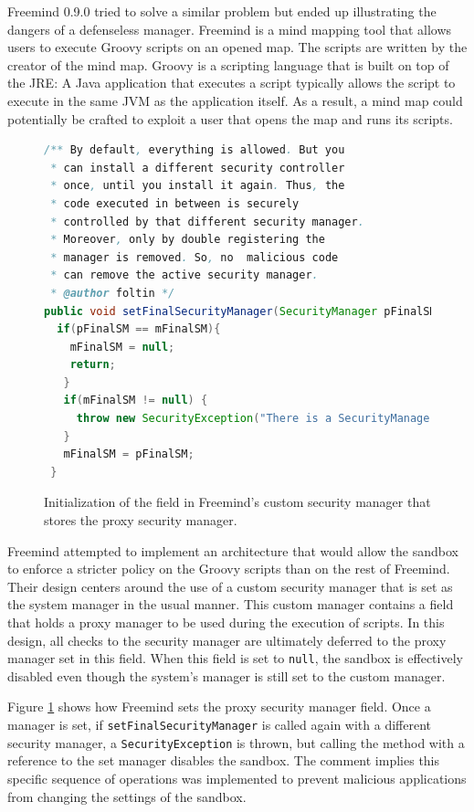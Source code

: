 \documentclass{sig-alternate}
\begin{document}
Freemind 0.9.0 tried to solve a similar problem but ended up illustrating
the dangers of a defenseless manager. Freemind is a mind mapping tool
that allows users to execute Groovy scripts on an opened map. The
scripts are written by the creator of the mind map. Groovy is a scripting
language that is built on top of the JRE: A Java application that
executes a script typically allows the script to execute in the same
JVM as the application itself. As a result, a mind map could potentially
be crafted to exploit a user that opens the map and runs its scripts.

\begin{figure}
\begin{lstlisting}[language=Java,firstnumber=31]
/** By default, everything is allowed. But you
 * can install a different security controller
 * once, until you install it again. Thus, the
 * code executed in between is securely
 * controlled by that different security manager.  
 * Moreover, only by double registering the
 * manager is removed. So, no  malicious code 
 * can remove the active security manager.  
 * @author foltin */
public void setFinalSecurityManager(SecurityManager pFinalSM) {
  if(pFinalSM == mFinalSM){
    mFinalSM = null;
    return;
   } 		
   if(mFinalSM != null) {
     throw new SecurityException("There is a SecurityManager installed already."); 		
   } 		
   mFinalSM = pFinalSM;
 }	
\end{lstlisting}
\caption{Initialization of the field in Freemind's custom security manager\label{fig:Freemind-Security-Manager}
that stores the proxy security manager. }
\end{figure}

Freemind attempted to implement an architecture that would allow the
sandbox to enforce a stricter policy on the Groovy scripts than on
the rest of Freemind. Their design centers around the use of a custom
security manager that is set as the system manager in the usual manner.
This custom manager contains a field that holds a proxy manager to be used during the execution of
scripts. In this design, all checks to the security manager are ultimately
deferred to the proxy manager set in this field. When
this field is set to \texttt{null}, the sandbox is effectively disabled
even though the system's manager is still set to the custom manager.

Figure \ref{fig:Freemind-Security-Manager} shows how Freemind sets
the proxy security manager field.
Once a manager is set, if \texttt{setFinalSecurityManager} is called
again with a different security manager, a \texttt{SecurityException}
is thrown, but calling the method with a reference to the set manager disables the sandbox. The comment implies this specific sequence
of operations was implemented to prevent malicious applications from
changing the settings of the sandbox.
\end{document}

